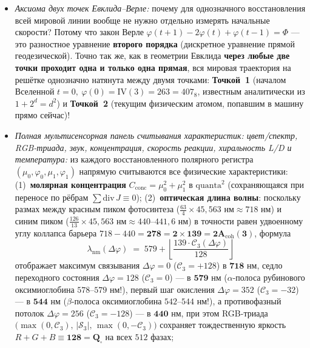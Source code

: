 \begin{enumerate}[label=\textbf{\arabic*.},leftmargin=*]
\begin{itemize}[noitemsep]
\begin{itemize}[noitemsep]
      \[
        \varphi(x_{\mathrm{target}}, \tau_{\mathrm{target}})
        \;=\;
        \Bigl(\varphi_{\mathrm{anchor}} + 41\,\Delta x + \Delta\tau\cdot v_0 + \frac{\Delta\tau(\Delta\tau + 1)}{2}\,\Phi\Bigr)\bmod 512,
      \]
      причём результат тождественно совпадает с пошаговой итерацией и не зависит от того, какой именно атом в комнате был взят за начальный якорь!
    \item \emph{Аксиома двух точек Евклида--Верле:}
      почему для однозначного восстановления всей мировой линии вообще не нужно отдельно измерять начальные скорости? Потому что закон Верле $\varphi(t+1) - 2\varphi(t) + \varphi(t-1) = \Phi$ --- это разностное уравнение \textbf{второго порядка} (дискретное уравнение прямой геодезической). Точно так же, как в геометрии Евклида \textbf{через любые две точки проходит одна и только одна прямая}, вся мировая траектория на решётке однозначно натянута между двумя точками: \textbf{Точкой~1} (началом Вселенной $t = 0,\ \varphi(0) = \mathrm{IV}(3) = 263 = 407_8$, известным аналитически из $1+2^d=d^2$) и \textbf{Точкой~2} (текущим физическим атомом, попавшим в машину прямо сейчас)!
    \item \emph{Полная мультисенсорная панель считывания характеристик: цвет/спектр, RGB-триада, звук, концентрация, скорость реакции, хиральность L/D и температура:}
      из каждого восстановленного полярного регистра $(\mu_0, \varphi_0, \mu_1, \varphi_1)$ напрямую считываются все физические характеристики:
      (1)~\textbf{молярная концентрация} $C_{\mathrm{conc}} = \mu_0^2 + \mu_1^2$ в $\mathrm{quanta}^2$ (сохраняющаяся при переносе по рёбрам $\sum \mathrm{div}\,J \equiv 0$);
      (2)~\textbf{оптическая длина волны}: поскольку размах между красным пиком фотосинтеза ($\frac{63}{4}\times 45{,}563\text{ нм}\approx 718\text{ нм}$) и синим пиком ($\frac{126}{13}\times 45{,}563\text{ нм}\approx 440\text{--}441{,}6\text{ нм}$) в точности равен удвоенному углу коллапса барьера $718 - 440 = \mathbf{278 = 2\times 139 = 2A_{\mathrm{coh}}(3)}$, формула
      \[
        \lambda_{\mathrm{nm}}(\Delta\varphi) \;=\; 579 + \left\lfloor\frac{139\cdot\mathcal{C}_3(\Delta\varphi)}{128}\right\rfloor
      \]
      отображает максимум связывания $\Delta\varphi=0$ ($\mathcal{C}_3=+128$) в $\mathbf{718\text{ нм}}$, седло переходного состояния $\Delta\varphi=128$ ($\mathcal{C}_3=0$) --- в $\mathbf{579\text{ нм}}$ ($\alpha$-полоса рубинового оксимиоглобина $578\text{--}579\text{ нм}$!), первый шаг окисления $\Delta\varphi=352$ ($\mathcal{C}_3=-32$) --- в $\mathbf{544\text{ нм}}$ ($\beta$-полоса оксимиоглобина $542\text{--}544\text{ нм}$!), а противофазный потолок $\Delta\varphi=256$ ($\mathcal{C}_3=-128$) --- в $\mathbf{440\text{ нм}}$, при этом RGB-триада $\bigl(\max(0,\mathcal{C}_3),\,|\mathcal{S}_3|,\,\max(0,-\mathcal{C}_3)\bigr)$ сохраняет тождественную яркость $R + G + B \equiv \mathbf{128 = Q_\square}$ на всех $512$ фазах;

\end{itemize}
\end{itemize}
\end{enumerate}
